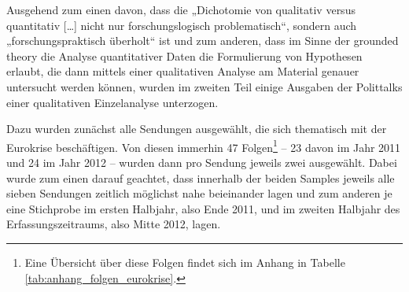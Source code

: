 Ausgehend zum einen davon, dass die „Dichotomie von qualitativ versus quantitativ [\ldots] nicht nur forschungslogisch problematisch“, sondern auch „forschungspraktisch überholt“ \parencite[14]{bucherGrundlagenInteraktionalenRezeptionstheorie2012} ist und zum anderen, dass im Sinne der grounded theory die Analyse quantitativer Daten die Formulierung von Hypothesen erlaubt, die dann mittels einer qualitativen Analyse am Material genauer untersucht werden können, wurden im zweiten Teil einige Ausgaben der Polittalks einer qualitativen Einzelanalyse unterzogen.

Dazu wurden zunächst alle Sendungen ausgewählt, die sich thematisch mit der Eurokrise beschäftigen. Von diesen immerhin 47 Folgen\footnote{Eine Übersicht über diese Folgen findet sich im Anhang in Tabelle \vref{tab:anhang_folgen_eurokrise}.} – 23 davon im Jahr 2011 und 24 im Jahr 2012 – wurden dann pro Sendung jeweils zwei ausgewählt. Dabei wurde zum einen darauf geachtet, dass innerhalb der beiden Samples jeweils alle sieben Sendungen zeitlich möglichst nahe beieinander lagen und zum anderen je eine Stichprobe im ersten Halbjahr, also Ende 2011, und im zweiten Halbjahr des Erfassungszeitraums, also Mitte 2012, lagen.

\begin{table}[htb]\label{tab:qualdaten1}
	\caption{Sample 1 für die Einzelanalyse}
	\centering
\end{table}

